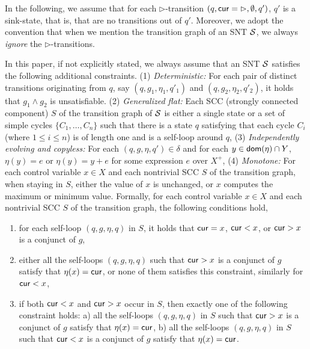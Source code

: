 In the following, we assume that for each $\triangleright$-transition $(q, \mathsf{cur} = \rhd, \emptyset, q')$, $q'$ is a sink-state, that is, that are no transitions out of $q'$. Moreover, we adopt the convention that when we mention the transition graph of an SNT ${\mathcal{S} }$, we always \emph{ignore} the $\triangleright$-transitions. 

In this paper, if not explicitly stated, we always assume that an SNT ${\mathcal{S} }$ satisfies the following additional constraints. (1) \emph{Deterministic:} For each pair of distinct transitions originating from $q$, say $(q, g_1, \eta_1,q'_1)$ and $(q, g_2,\eta_2,q'_2)$, it holds that $g_1 \wedge g_2$ is unsatisfiable. (2) \emph{Generalized flat:} Each SCC (strongly connected component) $S$ of the transition graph of ${\mathcal{S} }$ is either a single state or a set of simple cycles $\{C_1,\dots, C_n\}$ such that there is a state $q$ satisfying that each cycle $C_i$ (where $1 \le i \le n$) is of length one and is a self-loop around $q$,
%
(3) \emph{Independently evolving and copyless:} For each $(q, g, \eta, q') \in \delta$ and for each $y \in \mathsf{dom}(\eta) \cap Y$, $\eta(y)=e$ or $\eta(y)=y+e$ for some expression $e$ over $X^+$, (4) \emph{Monotone:}   For each control variable $x \in X$ and each nontrivial SCC $S$ of the transition graph,  when staying in $S$, either the value of $x$ is unchanged, or $x$ computes the maximum or minimum value. Formally, 
for each control variable $x \in X$ and each nontrivial SCC $S$ of the transition graph, the following conditions hold, 
\begin{enumerate}
\item for each self-loop $(q, g, \eta, q)$ in $S$, it holds that $\mathsf{cur} = x$, $\mathsf{cur}< x$, or $\mathsf{cur} > x$ is a conjunct of $g$, 
%
\item either all the self-loops $(q, g, \eta, q)$ such that $\mathsf{cur} > x $ is a conjunct of $g$ satisfy that $\eta(x)=\mathsf{cur}$, or none of them satisfies this constraint,  similarly for $\mathsf{cur} < x$,
%
\item if both $\mathsf{cur} < x$ and $\mathsf{cur} > x$ occur in $S$,  then exactly one of the following constraint holds: a) all the self-loops $(q, g, \eta, q)$ in $S$ such that $\mathsf{cur} > x$ is a conjunct of $g$ satisfy that $\eta(x)=\mathsf{cur}$, b) all the self-loops $(q, g, \eta, q)$ in $S$ such that $\mathsf{cur} < x$ is a conjunct of $g$ satisfy that $\eta(x) = \mathsf{cur}$.
\end{enumerate}



